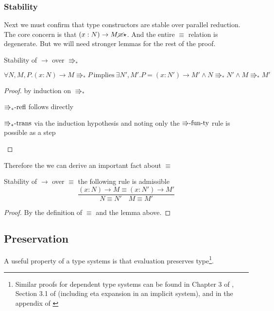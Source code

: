 \subsubsection{Stability}
Next we must confirm that type constructors are stable over parallel reduction.
The core concern is that $\left(x:N\right)\rightarrow M\cancel{\equiv}\star$.
And the entire $\equiv$ relation is degenerate.
But we will need stronger lemmas for the rest of the proof.

\begin{lem}
Stability of $\rightarrow$ over $\Rrightarrow_{\ast}$

$\forall N,M,P.\left(x:N\right)\rightarrow M\Rrightarrow_{\ast}P\:\mathrm{implies}\:\exists N',M'.P=\left(x:N'\right)\rightarrow M'\land N\Rrightarrow_{\ast}N'\land M\Rrightarrow_{\ast}M'$
\end{lem}

\begin{proof}
by induction on $\Rrightarrow_{\ast}$
\begin{casenv}
  \item $\textrm{\ensuremath{\Rrightarrow_{\ast}}-refl}$ follows directly
  \item $\textrm{\ensuremath{\Rrightarrow_{\ast}}-trans}$ via the induction hypothesis and noting only the $\textrm{\ensuremath{\Rrightarrow}-fun-ty}$ rule is possible as a step
\end{casenv}
\end{proof}
Therefore the we can derive an important fact about $\equiv$
\begin{cor}
Stability of $\rightarrow$ over $\equiv$
the following rule is admissible
\[
\frac{\left(x:N\right)\rightarrow M\equiv\left(x:N'\right)\rightarrow M'}{N\equiv N'\quad M\equiv M'}
\]
\end{cor}

\begin{proof}
By the definition of $\equiv$ and the lemma above.
\end{proof}

\subsection{Preservation}

A useful property of a type systems is that evaluation preserves type\footnote{
   Similar proofs for dependent type systems can be found in Chapter 3 of \cite{luo1994computation}, Section 3.1 of \cite{10.1007/3-540-45413-6_27}(including eta expansion in an implicit system), and in the appendix of \cite{sjoberg2012irrelevance}}.


